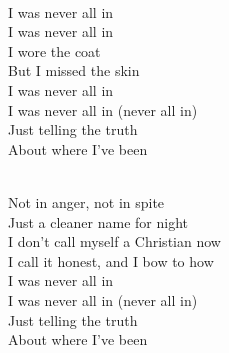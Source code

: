 \begin{lyrics}
\\
I was never all in\\
I was never all in\\
I wore the coat\\
But I missed the skin\\
I was never all in\\
I was never all in
(never all in)\\
Just telling the truth\\
About where I’ve been

\\
Not in anger, not in spite\\
Just a cleaner name for night\\
I don’t call myself a Christian now\\
I call it honest, and I bow to how\\
I was never all in\\
I was never all in
(never all in)\\
Just telling the truth\\
About where I’ve been
\end{lyrics}

